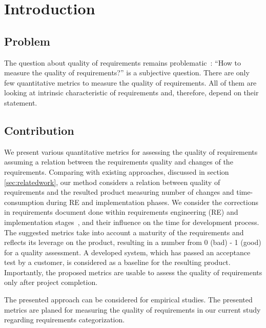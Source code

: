 \section{Introduction}
\label{sec:Intro} 

\subsection{Problem}
The question about quality of requirements remains problematic~\cite{Fernandez2016}: 
``How to measure the quality of requirements?'' is a subjective question.  
There are only few quantitative metrics to measure the quality of requirements. 
All of them are looking at intrinsic characteristic of requirements and, therefore, depend on their statement.

\subsection{Contribution}
We present various quantitative metrics for assessing the quality of requirements assuming a relation 
between the requirements quality and changes of the requirements. Comparing with existing approaches, 
discussed in section \autoref{sec:relatedwork}, our method considers a relation between quality of 
requirements and the resulted product measuring number of changes and time-consumption during RE and 
implementation phases. We consider the corrections in requirements document done within 
requirements engineering (RE) and implementation stages~\cite{FARBEY:1990}, and their influence on the time 
for development process. The suggested metrics take into account a maturity of the requirements 
and reflects its leverage on the product, resulting in a number from 0 (bad) - 1 (good) for a quality assessment.  
A developed system, which has passed an acceptance test by a customer, is considered as a baseline 
for the resulting product. Importantly, the proposed metrics are usable to assess the quality of requirements 
only after project completion. 

The presented approach can be considered for empirical studies. The presented metrics are planed for measuring 
the quality of requirements in our current study regarding requirements categorization.
